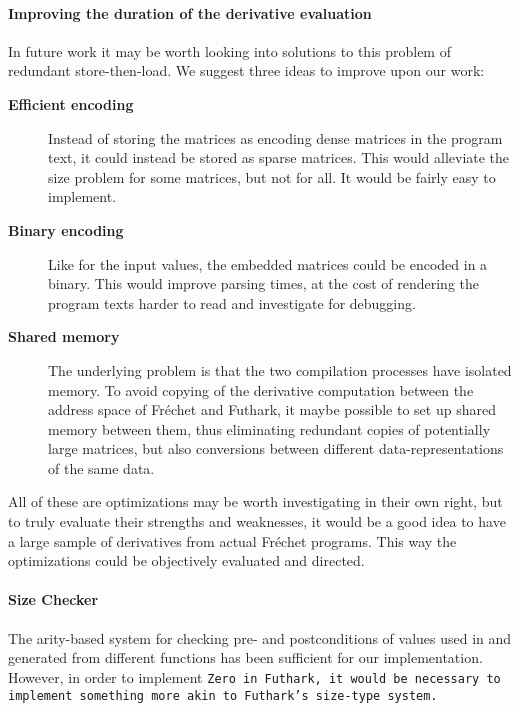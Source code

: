 \paragraph{Improving the duration of the derivative evaluation}
In future work it may be worth looking into solutions to this problem of
redundant store-then-load.  We suggest three ideas to improve upon our work:

\begin{description}

\item [\textbf{Efficient encoding}]  Instead of storing the matrices as encoding
  dense matrices in the program text, it could instead be stored as sparse
    matrices.  This would alleviate the size problem for some matrices, but not
    for all.  It would be fairly easy to implement.

\item [\textbf{Binary encoding}]  Like for the input values, the embedded
  matrices could be encoded in a binary.  This would improve parsing times, at
    the cost of rendering the program texts harder to read and investigate for
    debugging.

\item [\textbf{Shared memory}] The underlying problem is that the two
  compilation processes have isolated memory.  To avoid copying of the
    derivative computation between the address space of Fréchet and Futhark, it
    maybe possible to set up shared memory between them, thus eliminating
    redundant copies of potentially large matrices, but also conversions between
    different data-representations of the same data.

\end{description}

All of these are optimizations may be worth investigating in their own right,
but to truly evaluate their strengths and weaknesses, it would be a good idea to
have a large sample of derivatives from actual Fréchet programs.  This way
the optimizations could be objectively evaluated and directed.

\paragraph{Size Checker}
The arity-based system for checking pre- and postconditions of values used in
and generated from different functions has been sufficient for our implementation.
However, in order to implement \tt{Zero} in Futhark, it would be necessary to
implement something more akin to Futhark's size-type system.

